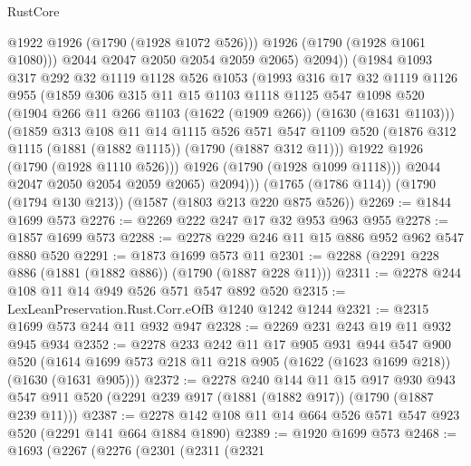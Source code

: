 \begin{lexlean}{RustCore}
\begin{coremodule}
                  @1922
                  @1926
                  (@1790 (@1928 @1072 @526)))
                @1926
                (@1790 (@1928 @1061 @1080)))
              @2044
              @2047
              @2050
              @2054
              @2059
              @2065)
            @2094))
        (@1984
          @1093
          @317
          @292
          @32
          @1119
          @1128
          @526
          @1053
          (@1993
            @316
            @17
            @32
            @1119
            @1126
            @955
            (@1859
              @306
              @315
              @11
              @15
              @1103
              @1118
              @1125
              @547
              @1098
              @520
              (@1904 @266 @11 @266 @1103 (@1622 (@1909 @266)) (@1630 (@1631 @1103)))
              (@1859
                @313
                @108
                @11
                @14
                @1115
                @526
                @571
                @547
                @1109
                @520
                (@1876 @312 @1115 (@1881 (@1882 @1115)) (@1790 (@1887 @312 @11)))
                @1922
                @1926
                (@1790 (@1928 @1110 @526)))
              @1926
              (@1790 (@1928 @1099 @1118)))
            @2044
            @2047
            @2050
            @2054
            @2059
            @2065)
          @2094)))
    (@1765 (@1786 @114))
    (@1790 (@1794 @130 @213))
    (@1587 (@1803 @213 @220 @875 @526))
@2269 := @1844 @1699 @573
@2276 := @2269 @222 @247 @17 @32 @953 @963 @955
@2278 := @1857 @1699 @573
@2288 := @2278 @229 @246 @11 @15 @886 @952 @962 @547 @880 @520
@2291 := @1873 @1699 @573 @11
@2301 := @2288 (@2291 @228 @886 (@1881 (@1882 @886)) (@1790 (@1887 @228 @11)))
@2311 := @2278 @244 @108 @11 @14 @949 @526 @571 @547 @892 @520
@2315 := LexLeanPreservation.Rust.Corr.eOfB @1240 @1242 @1244
@2321 := @2315 @1699 @573 @244 @11 @932 @947
@2328 := @2269 @231 @243 @19 @11 @932 @945 @934
@2352 := @2278
    @233
    @242
    @11
    @17
    @905
    @931
    @944
    @547
    @900
    @520
    (@1614 @1699 @573 @218 @11 @218 @905 (@1622 (@1623 @1699 @218)) (@1630 (@1631 @905)))
@2372 := @2278
    @240
    @144
    @11
    @15
    @917
    @930
    @943
    @547
    @911
    @520
    (@2291 @239 @917 (@1881 (@1882 @917)) (@1790 (@1887 @239 @11)))
@2387 := @2278 @142 @108 @11 @14 @664 @526 @571 @547 @923 @520 (@2291 @141 @664 @1884 @1890)
@2389 := @1920 @1699 @573
@2468 := @1693
    (@2267
      (@2276
        (@2301
          (@2311
            (@2321

\end{coremodule}
\end{lexlean}
